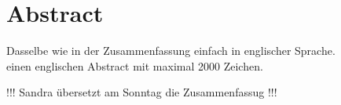 \newpage
\section*{Abstract}
Dasselbe wie in der Zusammenfassung einfach in englischer Sprache.\\
einen englischen Abstract mit maximal 2000 Zeichen.

!!! Sandra übersetzt am Sonntag die Zusammenfassug !!!